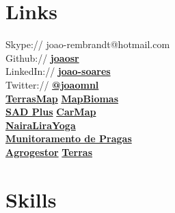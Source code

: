 \documentclass[]{joaosoares-resume}
\begin{document}
\begin{minipage}[t]{0.35\textwidth}
\section{Links} 
Skype:// joao-rembrandt@hotmail.com \\
Github:// \href{https://github.com/joaosr}{\bf joaosr} \\
LinkedIn://  \href{https://www.linkedin.com/in/joao-soares}{\bf joao-soares} \\
Twitter://  \href{https://twitter.com/joao_mnl}{\bf @joao\underline{\hspace{.10in}}mnl}\\
\sectionsep
{}
\href{https://goo.gl/6gUzPA}{\bf TerrasMap} \textbullet{}
\href{https://goo.gl/eYX5SW}{\bf MapBiomas} \\
\href{https://goo.gl/2J41hR}{\bf SAD Plus} \textbullet{}
\href{https://goo.gl/fCCp9s}{\bf CarMap}\\
\href{https://goo.gl/wrN029}{\bf NairaLiraYoga}\\
\sectionsep
{}
\href{https://goo.gl/RcdbHk}{\bf Munitoramento de Pragas} \\
\href{https://goo.gl/mycBmL}{\bf Agrogestor} \textbullet{}
\href{https://goo.gl/OyZXke}{\bf Terras}\\
\sectionsep




\section{Skills}


\end{minipage}
\end{document}

